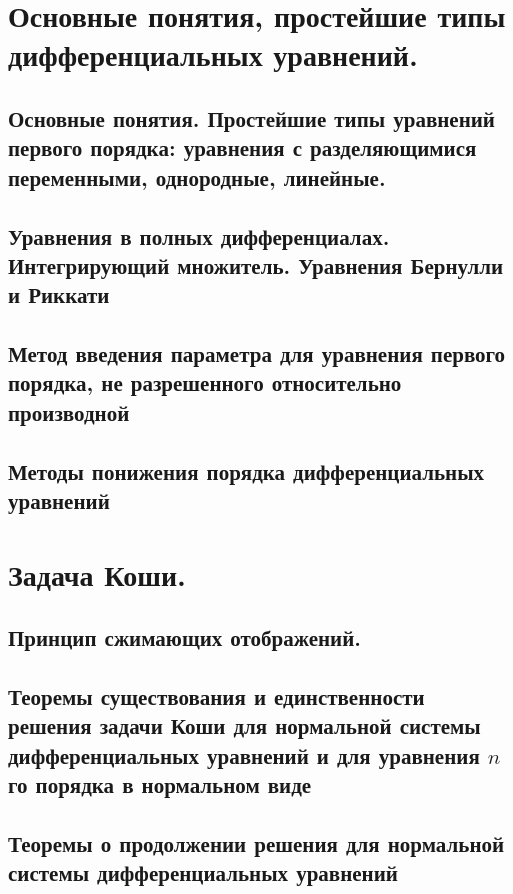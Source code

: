 \section{Основные понятия, простейшие типы дифференциальных уравнений.}

\subsection{Основные понятия. Простейшие типы уравнений первого порядка: уравнения с разделяющимися переменными, однородные, линейные.}

\newpage

\subsection{Уравнения в полных дифференциалах. Интегрирующий множитель. Уравнения Бернулли и Риккати}

\newpage

\subsection{Метод введения параметра для уравнения первого порядка, не разрешенного относительно производной}


\subsection{Методы понижения порядка дифференциальных уравнений}


\newpage
\section{Задача Коши.}

\subsection{Принцип сжимающих отображений.}

\newpage

\subsection{Теоремы существования и единственности решения задачи Коши для нормальной системы дифференциальных уравнений и для уравнения \texorpdfstring{$n$}-го порядка в нормальном виде}

\newpage

\subsection{Теоремы о продолжении решения для нормальной системы дифференциальных уравнений}

\newpage

